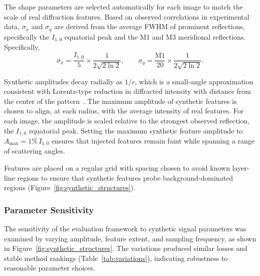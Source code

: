 \documentclass[iucr]{iucrjournals}
\begin{document}
The shape parameters are selected automatically for each image to match the scale of real diffraction features. Based on observed correlations in experimental data, $\sigma_x$ and $\sigma_y$ are derived from the average FWHM of prominent reflections, specifically the $I_{1,0}$ equatorial peak and the M1 and M3 meridional reflections. Specifically,
\begin{equation}
\sigma_x = \frac{I_{1,0}}{5} \times \frac{1}{2\sqrt{2\ln2}}, 
\qquad
\sigma_y = \frac{\mathrm{M1}}{20} \times \frac{1}{2\sqrt{2\ln2}}.
\end{equation}


Synthetic amplitudes decay radially as $1/r$, which is a small-angle approximation consistent with Lorentz-type reduction in diffracted intensity with distance from the center of the pattern~\cite{Buerger1940,Denny1995}. The maximum amplitude of synthetic features is chosen to align, at each radius, with the average intensity of real features. For each image, the amplitude is scaled relative to the strongest observed reflection, the $I_{1,0}$ equatorial peak. Setting the maximum synthetic feature amplitude to $A_{\mathrm{max}} = 1\%\, I_{1,0}$ ensures that injected features remain faint while spanning a range of scattering angles.

Features are placed on a regular grid with spacing chosen to avoid known layer-line regions to ensure that synthetic features probe background-dominated regions (Figure~\ref{fig:synthetic_structures}).

\subsubsection{Parameter Sensitivity}

The sensitivity of the evaluation framework to synthetic signal parameters was examined by varying amplitude, feature extent, and sampling frequency, as shown in Figure~\ref{fig:synthetic_structures}. The variations produced similar losses and stable method rankings (Table~\ref{tab:variations}), indicating robustness to reasonable parameter choices.
\end{document}
